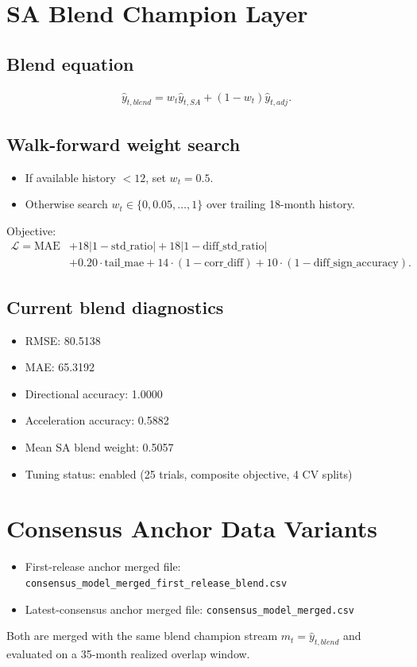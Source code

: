 \documentclass[11pt]{article}
\begin{document}
\section{SA Blend Champion Layer}
\subsection{Blend equation}
\begin{align}
\hat{y}_{t,blend}=w_t\hat{y}_{t,SA}+(1-w_t)\hat{y}_{t,adj}.
\end{align}

\subsection{Walk-forward weight search}
\begin{itemize}
    \item If available history $<12$, set $w_t=0.5$.
    \item Otherwise search $w_t\in\{0,0.05,\dots,1\}$ over trailing 18-month history.
\end{itemize}
Objective:
\begin{align}
\mathcal{L} =
\text{MAE}
&+18\lvert1-\text{std\_ratio}\rvert
+18\lvert1-\text{diff\_std\_ratio}\rvert \nonumber\\
&+0.20\cdot\text{tail\_mae}
+14\cdot(1-\text{corr\_diff})
+10\cdot(1-\text{diff\_sign\_accuracy}).
\end{align}

\subsection{Current blend diagnostics}
\begin{itemize}
    \item RMSE: 80.5138
    \item MAE: 65.3192
    \item Directional accuracy: 1.0000
    \item Acceleration accuracy: 0.5882
    \item Mean SA blend weight: 0.5057
    \item Tuning status: enabled (25 trials, composite objective, 4 CV splits)
\end{itemize}

\section{Consensus Anchor Data Variants}
\begin{itemize}
    \item First-release anchor merged file: \texttt{consensus\_model\_merged\_first\_release\_blend.csv}
    \item Latest-consensus anchor merged file: \texttt{consensus\_model\_merged.csv}
\end{itemize}
Both are merged with the same blend champion stream $m_t=\hat{y}_{t,blend}$ and evaluated on a 35-month realized overlap window.
\end{document}
